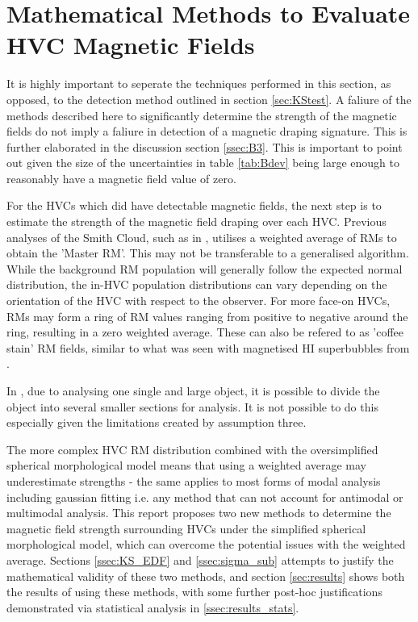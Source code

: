 \section{Mathematical Methods to Evaluate HVC Magnetic Fields}
\label{sec:evaluation}

It is highly important to seperate the techniques performed in this section, as opposed, to the detection method outlined in section \ref{sec:KStest}. A faliure of the methods described here to significantly determine the strength of the magnetic fields do not imply a faliure in detection of a magnetic draping signature. This is further elaborated in the discussion section \ref{ssec:B3}. This is important to point out given the size of the uncertainties in table \ref{tab:Bdev} being large enough to reasonably have a magnetic field value of zero.


For the HVCs which did have detectable magnetic fields, the next step is to estimate the strength of the magnetic field draping over each HVC. Previous analyses of the Smith Cloud, such as in \cite{ID5, ID26}, utilises a weighted average of RMs to obtain the 'Master RM'. This may not be transferable to a generalised algorithm. While the background RM population will generally follow the expected normal distribution, the in-HVC population distributions can vary depending on the orientation of the HVC with respect to the observer. For more face-on HVCs, RMs may form a ring of RM values ranging from positive to negative around the ring, resulting in a zero weighted average. These can also be refered to as 'coffee stain' RM fields, similar to what was seen with magnetised HI superbubbles from \cite{ID75}.


In \cite{ID5, ID26}, due to analysing one single and large object, it is possible to divide the object into several smaller sections for analysis. It is not possible to do this especially given the limitations created by assumption three.


The more complex HVC RM distribution combined with the oversimplified spherical morphological model means that using a weighted average may underestimate strengths - the same applies to most forms of modal analysis including gaussian fitting i.e. any method that can not account for antimodal or multimodal analysis. This report proposes two new methods to determine the magnetic field strength surrounding HVCs under the simplified spherical morphological model, which can overcome the potential issues with the weighted average. Sections \ref{ssec:KS_EDF} and \ref{ssec:sigma_sub} attempts to justify the mathematical validity of these two methods, and section \ref{sec:results} shows both the results of using these methods, with some further post-hoc justifications demonstrated via statistical analysis in \ref{ssec:results_stats}.


